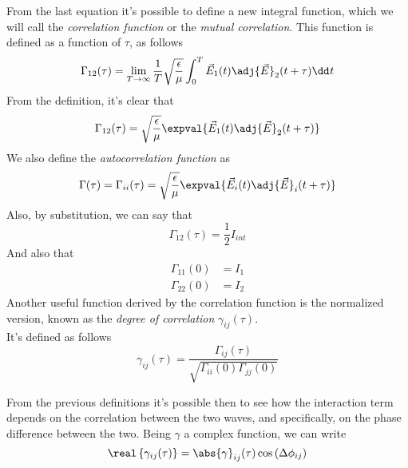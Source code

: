 \documentclass[../electromagnetism.tex]{subfiles}
\begin{document}
\begin{dfn}
	From the last equation it's possible to define a new integral function, which we will call the \textit{correlation function} or the \textit{mutual correlation}. This function is defined as a function of $\tau$, as follows
	\begin{equation}
		\Gamma_{12}(\tau)=\lim_{T\to\infty}\frac{1}{T}\sqrt{\frac{\epsilon}{\mu}}\int_{0}^{T}\vec{E}_1(t)\adj{\vec{E}}_2(t+\tau)\dd^{}{t}
		\label{eq:correlationfunc.pcorr}
	\end{equation}
	From the definition, it's clear that
	\begin{equation*}
		\Gamma_{12}(\tau)=\sqrt{\frac{\epsilon}{\mu}}\expval{\vec{E}_{1}(t)\adj{\vec{E}}_{2}(t+\tau)}
	\end{equation*}
	We also define the \textit{autocorrelation function} as
	\begin{equation}
		\Gamma(\tau)=\Gamma_{ii}(\tau)=\sqrt{\frac{\epsilon}{\mu}}\expval{\vec{E}_i(t)\adj{\vec{E}}_i(t+\tau)}
		\label{eq:autocorrelation.pcorr}
	\end{equation}
	Also, by substitution, we can say that
	\begin{equation*}
		\Gamma_{12}(\tau)=\frac{1}{2}I_{int}
	\end{equation*}
	And also that
	\begin{equation*}
		\begin{aligned}
			\Gamma_{11}(0)&= I_1\\
			\Gamma_{22}(0)&= I_2
		\end{aligned}
	\end{equation*}
	Another useful function derived by the correlation function is the normalized version, known as the \textit{degree of correlation} $\gamma_{ij}(\tau)$.\\
	It's defined as follows
	\begin{equation}
		\gamma_{ij}(\tau)=\frac{\Gamma_{ij}(\tau)}{\sqrt{\Gamma_{ii}(0)\Gamma_{jj}(0)}}
		\label{eq:degreeofcorr.pcorr}
	\end{equation}
\end{dfn}
From the previous definitions it's possible then to see how the interaction term depends on the correlation between the two waves, and specifically, on the phase difference between the two. Being $\gamma$ a complex function, we can write
\begin{equation*}
	\real\left\{ \gamma_{ij}(\tau) \right\}=\abs{\gamma}_{ij}(\tau)\cos\left( \Delta\phi_{ij} \right)
\end{equation*}
\end{document}
